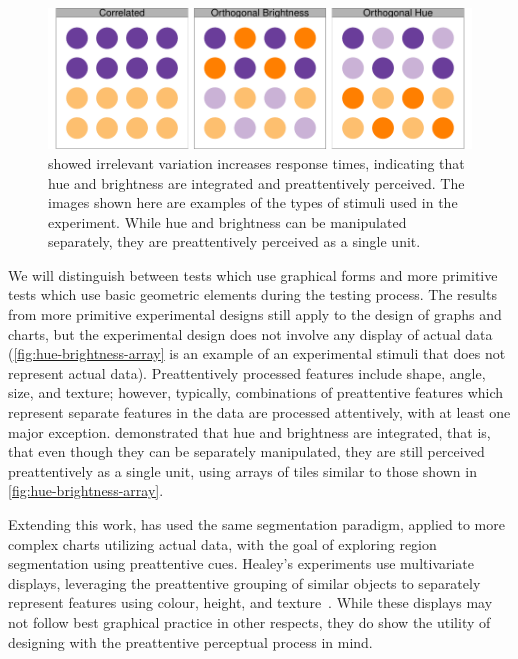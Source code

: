 \documentclass[letterpaper]{ar-1col}\usepackage[]{graphicx}\usepackage[]{color}
\begin{document}
\noindent\begin{figure}
\begin{minipage}[c]{.575\textwidth}
\centering
\includegraphics[width=\textwidth]{figure/hue-brightness-array-1}
\end{minipage}\hfill
\begin{minipage}[c]{.4\textwidth}
\caption{\citet{callaghanDimensionalInteractionHue1984} showed irrelevant variation increases response times, indicating that hue and brightness are integrated and preattentively perceived. The images shown here are examples of the types of stimuli used in the experiment. While hue and brightness can be manipulated separately, they are preattentively perceived as a single unit.}\label{fig:hue-brightness-array}
\end{minipage}
\end{figure}
We will distinguish between tests which use graphical forms and more primitive tests which use basic geometric elements during the testing process. The results from more primitive experimental designs still apply to the design of graphs and charts, but the experimental design does not involve any display of actual data (\autoref{fig:hue-brightness-array} is an example of an experimental stimuli that does not represent actual data). Preattentively processed features include shape, angle, size, and texture; however, typically, combinations of preattentive features which represent separate features in the data are processed attentively, with at least one major exception. \citet{callaghanDimensionalInteractionHue1984} demonstrated that hue and brightness are integrated, that is, that even though they can be separately manipulated, they are still perceived preattentively as a single unit, using arrays of tiles similar to those shown in \autoref{fig:hue-brightness-array}.

Extending this work, \citet{healeyHighspeedVisualEstimation1996} has used the same segmentation paradigm, applied to more complex charts utilizing actual data, with the goal of exploring region segmentation using preattentive cues. Healey's experiments use multivariate displays, leveraging the preattentive grouping of similar objects to separately represent features using colour, height, and texture~\citep{healeyLargeDatasetsGlance1999}. While these displays may not follow best graphical practice in other respects, %
they do show the utility of designing with the preattentive perceptual process in mind.
\end{document}
